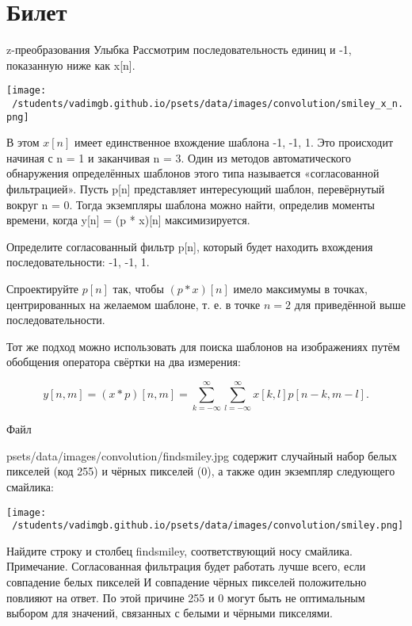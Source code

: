 \documentclass{exam}
\begin{document}
\section{Билет}
\begin{questions}
	\question 
z-преобразования 
	\question 
Улыбка
Рассмотрим последовательность единиц и -1, показанную ниже как x[n].
 
\texttt{[image: ~/students/vadimgb.github.io/psets/data/images/convolution/smiley\_x\_n.png]}

	В этом \(x[n]\) имеет единственное вхождение шаблона -1, -1, 1.
Это происходит начиная с n = 1 и заканчивая n = 3.
Один из методов автоматического обнаружения определённых шаблонов 
этого типа называется «согласованной фильтрацией».
Пусть p[n] представляет интересующий шаблон, перевёрнутый вокруг n = 0.
Тогда экземпляры шаблона можно найти, определив моменты 
времени, когда y[n] = (p * x)[n] максимизируется.

Определите согласованный фильтр p[n], который будет 
находить вхождения последовательности: -1, -1, 1.

Спроектируйте \(p[n]\) так, чтобы \((p*x)[n]\) имело максимумы в 
	точках, центрированных на желаемом шаблоне, т. е. в точке \( n = 2\) 
для приведённой выше последовательности.

Тот же подход можно использовать для поиска шаблонов на изображениях 
путём обобщения оператора свёртки на два измерения:


	\[
y[n,m]=(x*p)[n,m]=\sum_{k=-\infty}^\infty \sum_{l=-\infty}^\infty x[k,l]p[n-k, m-l].
\]

Файл 

	psets/data/images/convolution/findsmiley.jpg
содержит случайный набор белых пикселей (код 255) и чёрных пикселей (0), 
а также один экземпляр следующего смайлика:

\texttt{[image: ~/students/vadimgb.github.io/psets/data/images/convolution/smiley.png]} 

Найдите строку и столбец findsmiley, соответствующий носу смайлика.
Примечание. Согласованная фильтрация будет работать лучше всего, 
если совпадение белых пикселей И совпадение чёрных пикселей 
положительно повлияют на ответ.
По этой причине 255 и 0 могут быть не оптимальным выбором для значений, 
связанных с белыми и чёрными пикселями.

\end{questions}
\vspace{15pt}
\end{document}
